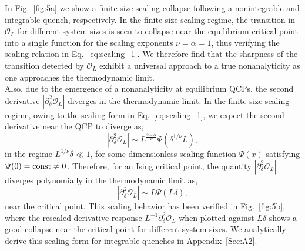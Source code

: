 \documentclass[aps,prx,twocolumn]{revtex4-2}
\begin{document}
 In Fig.~\ref{fig:5a} we show a finite size scaling collapse following a nonintegrable and integrable quench, respectively. In the finite-size scaling regime, the transition in $\mathcal{O}_L$ for different system sizes is seen to collapse near the equilibrium critical point into a single function for the scaling exponents $\nu=\alpha=1$, thus verifying the scaling relation in Eq.~\eqref{eq:scaling_1}. We therefore find that the sharpness of the transition detected by $\mathcal{O}_L$ exhibit a universal approach to a true nonanalyticity as one approaches the thermodynamic limit.\\

Also, due to the emergence of a nonanalyticity at equilibrium QCPs, the second derivative $\left|\partial_\delta^2\mathcal{O}_L\right|$ diverges in the thermodynamic limit. In the finite size scaling regime, owing to the scaling form in Eq.~\eqref{eq:scaling_1}, we expect the second derivative near the QCP to diverge as,
\begin{equation}
\left|\partial_{\delta}^2\mathcal{O}_L\right|\sim L^{\frac{2-\alpha}{\nu}}\Psi(\delta^{1/\nu} L),
\end{equation}
in the regime $L^{1/\nu}\delta \ll 1$, for some dimensionless scaling function $\Psi(x)$ satisfying $\Psi(0)={\rm const\neq 0}$. Therefore, for an Ising critical point, the quantity $\left|\partial_{\delta}^2\mathcal{O}_L\right|$ diverges polynomially in the thermodynamic limit as,
\begin{equation}\label{eq:chi_fs}
\left|\partial_{\delta}^2\mathcal{O}_L\right|\sim L\Psi( L\delta),
\end{equation}
near the critical point. This scaling behavior has been verified in Fig.~\ref{fig:5b}, where the rescaled derivative response $L^{-1}\partial_{\delta}^2\mathcal{O}_L$ when plotted against $L\delta$ shows a good collapse near the critical point for different system sizes.  {We analytically derive this scaling form for integrable quenches in Appendix~\ref{Sec:A2}}.\\
\end{document}
